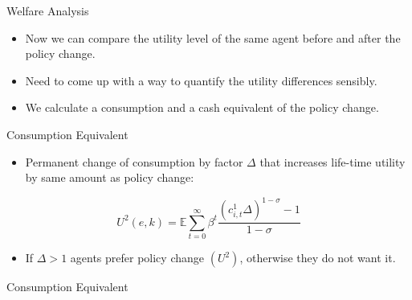 \documentclass{beamer}
\begin{document}
\begin{frame}{Welfare Analysis}
  \begin{itemize}
  \item {
  Now we can compare the utility level of the same agent before and after the policy change.
  }
  \item {
  Need to come up with a way to quantify the utility differences sensibly.
  }
  \item {
  We calculate a consumption and a cash equivalent of the policy change.
  }
  \end{itemize}
\end{frame}

\begin{frame}{Consumption Equivalent}
  \begin{itemize}

  \item {
  Permanent change of consumption by factor $\Delta$ that increases life-time
  utility by same amount as policy change:
  }
  \end{itemize}
  \begin{equation}
  U^{2}(e,k) = \mathbb{E}\sum_{t=0}^{\infty}\beta^{t}\frac{(c^{1}_{i,t}\Delta)^{1-\sigma}-1}{1-\sigma}\nonumber
  \end{equation}
  \begin{itemize}
  \item {
  If $ \Delta>1 $ agents prefer policy change $ (U^{2}) $, otherwise they do not want it.
  }
  \end{itemize}
\end{frame}

\begin{frame}{Consumption Equivalent}
\end{frame}
\end{document}
